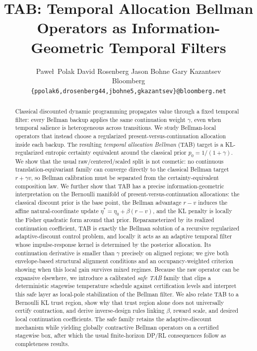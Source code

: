 \documentclass{article}
\title{TAB: Temporal Allocation Bellman Operators as Information-Geometric Temporal Filters}
\author{%
Pawe\l\ Polak \quad David Rosenberg \quad Jason Bohne \quad Gary Kazantsev\\
Bloomberg\\
\texttt{\{ppolak6,drosenberg44,jbohne5,gkazantsev\}@bloomberg.net}
}
\date{}
\theoremstyle{remark}
\begin{document}
\maketitle

\begin{abstract}
Classical discounted dynamic programming propagates value through a fixed temporal filter: every Bellman backup applies the same continuation weight $\gamma$, even when temporal salience is heterogeneous across transitions. We study Bellman-local operators that instead choose a regularized present-versus-continuation allocation inside each backup. The resulting \emph{temporal allocation Bellman} (TAB) target is a KL-regularized entropic certainty equivalent around the classical prior $p_0=1/(1+\gamma)$. We show that the usual raw/centered/scaled split is not cosmetic: no continuous translation-equivariant family can converge directly to the classical Bellman target $r+\gamma v$, so Bellman calibration must be separated from the certainty-equivalent composition law. We further show that TAB has a precise information-geometric interpretation on the Bernoulli manifold of present-versus-continuation allocations: the classical discount prior is the base point, the Bellman advantage $r-v$ induces the affine natural-coordinate update $\eta^*=\eta_0+\beta(r-v)$, and the KL penalty is locally the Fisher quadratic form around that prior. Reparameterized by its realized continuation coefficient, TAB is exactly the Bellman solution of a recursive regularized adaptive-discount control problem, and locally it acts as an adaptive temporal filter whose impulse-response kernel is determined by the posterior allocation. Its continuation derivative is smaller than $\gamma$ precisely on aligned regions; we give both envelope-based structural alignment conditions and an occupancy-weighted criterion showing when this local gain survives mixed regimes. Because the raw operator can be expansive elsewhere, we introduce a calibrated \emph{safe TAB} family that clips a deterministic stagewise temperature schedule against certification levels and interpret this safe layer as local-pole stabilization of the Bellman filter. We also relate TAB to a Bernoulli KL trust region, show why that trust region alone does not universally certify contraction, and derive inverse-design rules linking $\beta$, reward scale, and desired local continuation coefficients. The safe family retains the adaptive-discount mechanism while yielding globally contractive Bellman operators on a certified stagewise box, after which the usual finite-horizon DP/RL consequences follow as completeness results.
\end{abstract}
\end{document}
